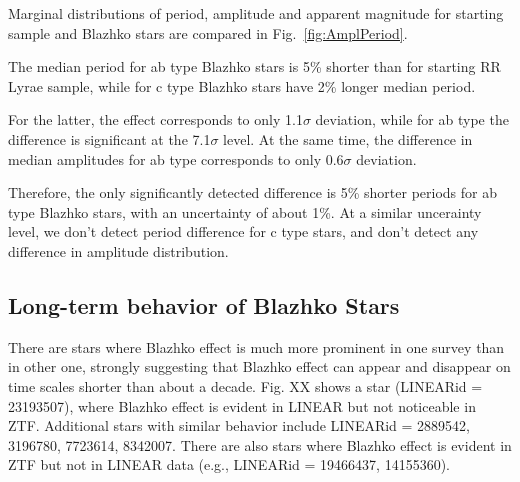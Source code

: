 Marginal distributions of  period, amplitude and apparent magnitude
for starting sample and Blazhko stars are compared in Fig.~\ref{fig:AmplPeriod}. 

The median period for ab type Blazhko stars is 5\% shorter than for starting
RR Lyrae sample, while for c type Blazhko stars have 2\% longer median period. 

For the latter, the effect corresponds to only 1.1$\sigma$ deviation, while for ab type the
difference is significant at the 7.1$\sigma$ level. At the same time, the difference in
median amplitudes for ab type corresponds to only 0.6$\sigma$ deviation. 

Therefore, the only significantly detected difference is 5\% shorter periods for
ab type Blazhko stars, with an uncertainty of about 1\%. At a similar uncerainty level,
we don't detect period difference for c type stars, and don't detect any difference
in amplitude distribution. 


\subsection{Long-term behavior of Blazhko Stars}


There are stars where Blazhko effect is much more prominent in one survey than in other one,
strongly suggesting that Blazhko effect can appear and disappear on time scales shorter than
about a decade. Fig. XX shows a star (LINEARid = 23193507), where Blazhko effect is evident in LINEAR but not noticeable
in ZTF. Additional stars with similar behavior include LINEARid = 2889542, 3196780, 7723614, 8342007.
There are also stars where Blazhko effect is evident in ZTF but not in LINEAR data (e.g., LINEARid = 19466437, 14155360). 




